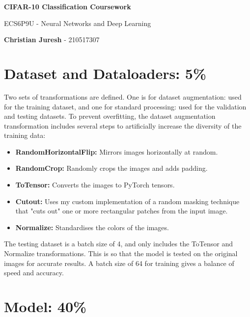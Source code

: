 \documentclass[12pt]{article}
\begin{document}
   \begin{center}
    \vspace{1.5cm}
    \vfill
       \Huge
       \textbf{CIFAR-10 Classification Coursework}

       \vspace{0.5cm}
       \LARGE
       ECS6P9U - Neural Networks and Deep Learning
        
       \large
       \vspace{0.5cm}
       \textbf{Christian Juresh} - 210517307
       \vspace{1.5cm}
   \end{center}

\section{Dataset and Dataloaders: 5\%}

Two sets of transformations are defined. One is for dataset augmentation: used for the training dataset, and one for standard processing: used for the validation and testing datasets. To prevent overfitting, the dataset augmentation transformation includes several steps to artificially increase the diversity of the training data:

\begin{itemize}
\item \textbf{RandomHorizontalFlip:} Mirrors images horizontally at random.

\item \textbf{RandomCrop:} Randomly crops the images and adds padding.

\item \textbf{ToTensor:} Converts the images to PyTorch tensors.

\item \textbf{Cutout:} Uses my custom implementation of a random masking technique that "cuts out" one or more rectangular patches from the input image. 

\item \textbf{Normalize:} Standardises the colors of the images.
\end{itemize}
The testing dataset is a batch size of 4, and only includes the ToTensor and Normalize transformations. This is so that the model is tested on the original images for accurate results. A batch size of 64 for training gives a balance of speed and accuracy.

\section{Model: 40\%}
\end{document}
